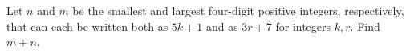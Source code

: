 Let $n$ and $m$ be the smallest and largest four-digit positive integers, respectively, that can each be written both as $5k+1$ and as $3r+7$ for integers $k,r$. Find $m+n$.
